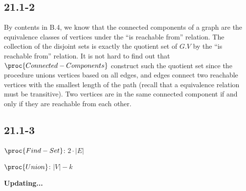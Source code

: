 \subsection*{21.1-2}

By contents in B.4, we know that the connected components of a graph
are the equivalence classes of vertices under the ``is reachable from'' relation.
The collection of the disjoint sets is exactly 
the quotient set of $G.V$ by the ``is reachable from'' relation.
It is not hard to find out that $\proc{Connected-Components}$
construct such the quotient set 
since the procedure unions vertices based on all edges, 
and edges connect two reachable vertices with the smallest length of the path
(recall that a equivalence relation must be transitive).
Two vertices are in the same connected component if and only if 
they are reachable from each other.

\subsection*{21.1-3}

$\proc{Find-Set}$: $2 \cdot |E|$

$\proc{Union}$: $|V| - k$




\centerline{\textbf{Updating...}}

